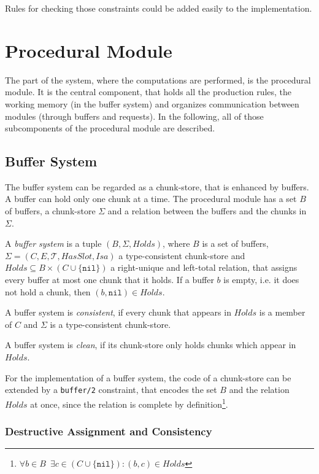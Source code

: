 Rules for checking those constraints could be added easily to the implementation.

\section{Procedural Module}

The part of the system, where the computations are performed, is the procedural module. It is the central component, that holds all the production rules, the working memory (in the buffer system) and organizes communication between modules (through buffers and requests). In the following, all of those subcomponents of the procedural module are described.

\subsection{Buffer System}

The buffer system can be regarded as a chunk-store, that is enhanced by buffers. A buffer can hold only one chunk at a time. The procedural module has a set $B$ of buffers, a chunk-store $\Sigma$ and a relation between the buffers and the chunks in $\Sigma$.

\begin{definition}
\label{def:buffer_system}
A \emph{buffer system} is a tuple $(B,\Sigma,Holds)$, where $B$ is a set of buffers, $\Sigma = (C, E, \mathcal{T}, HasSlot, Isa)$ a type-consistent chunk-store and $Holds \subseteq B \times (C \cup \{ \mathtt{nil} \})$ a right-unique and left-total relation, that assigns every buffer at most one chunk that it holds. If a buffer $b$ is empty, i.e. it does not hold a chunk, then $(b,\mathtt{nil}) \in Holds$.

A buffer system is \emph{consistent}, if every chunk that appears in $Holds$ is a member of $C$ and $\Sigma$ is a type-consistent chunk-store.

A buffer system is \emph{clean}, if its chunk-store only holds chunks which appear in $Holds$.
\end{definition}

For the implementation of a buffer system, the code of a chunk-store can be extended by a \verb|buffer/2| constraint, that encodes the set $B$ and the relation $Holds$ at once, since the relation is complete by definition\footnote{$\forall b \in B \enspace \exists c \in (C \cup \{ \mathtt{nil} \}): (b,c) \in Holds$}.

\subsubsection{Destructive Assignment and Consistency}
\label{destructive_assignment}

